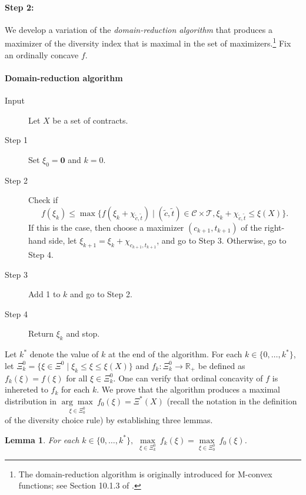 \documentclass[12pt]{amsart}
\newtheorem{lemma}{Lemma}
\theoremstyle{remark}
\begin{document}
\paragraph{Step 2: } We develop a variation of the {\it domain-reduction algorithm} that produces a maximizer of the diversity index that is maximal in the set of maximizers.\footnote{The domain-reduction algorithm is originally introduced for M-convex functions; see Section 10.1.3 of \cite{Murota:SIAM:2003}.}
Fix an ordinally concave $f$.
\medskip
\paragraph{\textbf{Domain-reduction algorithm}}
\begin{description}
\item[Input] Let $X$ be a set of contracts.
\item[Step 1] Set $\xi_0=\mathbf{0}$ and $k=0$.
\item[Step 2] Check if
$$
f(\xi_k) \leq \max\{f(\xi_k+\chi_{\tilde c, \tilde t})\mid (\tilde c, \tilde t) \in \mathcal C \times \mathcal T, \xi_k+\chi_{\tilde c, \tilde t}\leq \xi(X)\}.
$$
If this is the case, then choose a maximizer $(c_{k+1}, t_{k+1})$ of the right-hand side, let $\xi_{k+1}=\xi_k+\chi_{c_{k+1}, t_{k+1}}$, and go to Step 3. Otherwise, go to Step 4.
\item[Step 3] Add 1 to $k$ and go to Step 2.
\item[Step 4] Return $\xi_{k}$ and stop.
\end{description}
Let $k^*$ denote the value of $k$ at the end of the algorithm.
For each $k\in \{0, \dots, k^*\}$, let $\Xi^0_k=\{\xi \in \Xi^0\mid \xi_k\leq \xi\leq \xi(X)\}$ and $f_k: \Xi^0_k\rightarrow \mathbb{R}_+$ be defined as $f_k(\xi)=f(\xi)$ for all $\xi\in \Xi^0_k$. One can verify that ordinal concavity of $f$ is inhereted to $f_k$ for each $k$.
We prove that the algorithm produces a maximal distribution in $\underset {\xi\in \Xi^0_0} {\arg\max} \: f_0(\xi)=\Xi^*(X)$ (recall the notation in the definition of the diversity choice rule) by establishing three lemmas.
\begin{lemma}\label{lem:maximum-equal}
For each $k\in \{0, \dots, k^*\},$ $\underset {\xi\in \Xi^0_k} {\max} \: f_k(\xi)=\underset {\xi\in \Xi^0_0} {\max} \: f_0(\xi)$.
\end{lemma}
\end{document}
